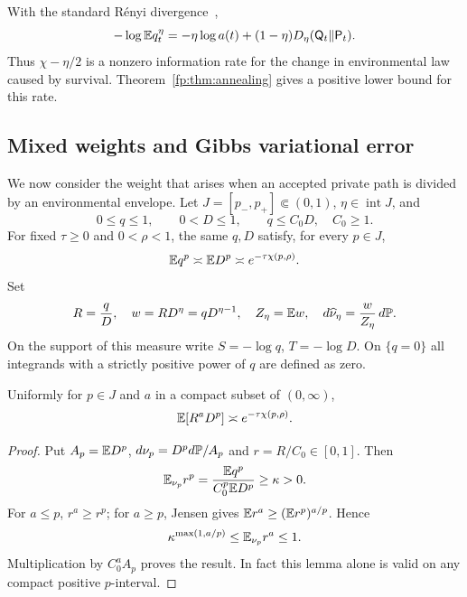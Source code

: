 \begin{remark}\label{fp:rem:renyi}
With the standard R\'enyi divergence~\cite{VanErvenHarremoes2014},
\begin{equation}\label{fp:eq:renyi}
 -\log\mathbb E q_t^\eta
 =-\eta\log a(t)+(1-\eta)D_\eta(\mathsf Q_t\Vert\mathsf P_t).
\end{equation}
Thus $\chi-\eta/2$ is a nonzero information rate for the change in environmental law caused by survival. Theorem~\ref{fp:thm:annealing} gives a positive lower bound for this rate.
\end{remark}


\subsection{Mixed weights and Gibbs variational error}\label{fp:sec:mixed}
We now consider the weight that arises when an accepted private path is divided by an environmental envelope. Let $J=[p_-,p_+]\Subset(0,1)$, $\eta\in\operatorname{int}J$, and
\[
 0\le q\le1,\qquad 0<D\le1,\qquad q\le C_0D,\quad C_0\ge1.
\]
For fixed $\tau\ge0$ and $0<\rho<1$, the same $q,D$ satisfy,
for every $p\in J$,
\begin{equation}\label{fp:eq:two-windows}
 \mathbb E q^p\asymp\mathbb E D^p\asymp e^{-\tau\chi(p,\rho)}.
\end{equation}
Set
\begin{equation}\label{fp:eq:mixed-measure}
 R=\frac qD,\quad w=RD^\eta=qD^{\eta-1},\quad
 Z_\eta=\mathbb E w,\quad d\widehat\nu_\eta=\frac w{Z_\eta}\,d\mathbb P.
\end{equation}
On the support of this measure write $S=-\log q$, $T=-\log D$. On $\{q=0\}$ all integrands with a strictly positive power of $q$ are defined as zero.

\begin{lemma}\label{fp:lem:mixed-power}
Uniformly for $p\in J$ and $a$ in a compact subset of $(0,\infty)$,
\begin{equation}\label{fp:eq:mixed-power}
 \mathbb E[R^aD^p]\asymp e^{-\tau\chi(p,\rho)}.
\end{equation}
\end{lemma}
\begin{proof}
Put $A_p=\mathbb E D^p$, $d\nu_p=D^p d\mathbb P/A_p$ and $r=R/C_0\in[0,1]$. Then
\[
 \mathbb E_{\nu_p}r^p
 =\frac{\mathbb E q^p}{C_0^p\mathbb E D^p}\ge\kappa>0.
\]
For $a\le p$, $r^a\ge r^p$; for $a\ge p$, Jensen gives $\mathbb E r^a\ge(\mathbb E r^p)^{a/p}$. Hence
\[
 \kappa^{\max(1,a/p)}\le\mathbb E_{\nu_p}r^a\le1.
\]
Multiplication by $C_0^aA_p$ proves the result. In fact this lemma alone is valid on any compact positive $p$-interval.
\end{proof}


